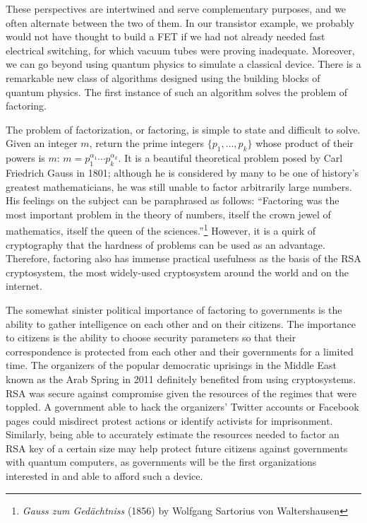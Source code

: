 These perspectives are intertwined and serve complementary purposes,
and we often alternate
between the two of them. In our transistor example, we probably would not
have thought to build a FET if we had not already needed fast electrical
switching, for which vacuum tubes were proving inadequate. Moreover, we can
go beyond using quantum physics to simulate a classical device. There is
a remarkable new class of algorithms designed using the building blocks of
quantum physics. The first instance of such an algorithm solves the problem
of factoring.

The problem of factorization, or factoring,
is simple to state and difficult to solve.
Given an integer $m$, return the prime integers $\{p_1, \ldots, p_k\}$ whose
product of their powers is $m$: $m = p_1^{\alpha_1}\cdots p_k^{\alpha_k}$.
It is a beautiful theoretical problem posed by Carl Friedrich Gauss in 1801;
although he is considered by many to be one of history's greatest mathematicians,
he was still unable to factor arbitrarily large numbers. 
His feelings on the subject can be paraphrased as follows:
``Factoring was the most important problem in the theory of
numbers, itself the crown jewel of mathematics, itself
the queen of the sciences.''\footnote{\emph{Gauss zum Ged\"achtniss} (1856) by
Wolfgang Sartorius von Waltershausen}
However,
it is a quirk of cryptography that the hardness of problems can be used as
an advantage. Therefore, factoring also has immense practical
usefulness as the basis of the RSA cryptosystem, the most widely-used
cryptosystem around the world and on the internet.

The somewhat sinister political importance of factoring to
governments is the ability to gather intelligence on each other and on their
citizens. The importance to citizens is the ability to choose security
parameters so that their correspondence is protected from each other and
their governments for a limited time.
The organizers of the popular democratic uprisings in the Middle East known
as the Arab Spring in 2011 definitely benefited from using cryptosystems.
RSA was
secure against compromise given the resources of the regimes that were
toppled.
A government able to hack the organizers' Twitter accounts or Facebook pages
could misdirect protest actions or identify activists for imprisonment.
Similarly, being able to accurately estimate the resources needed to factor
an RSA key of a certain size may help protect future citizens against
governments with quantum computers, as governments will be the first
organizations interested in and able to afford such a device.

